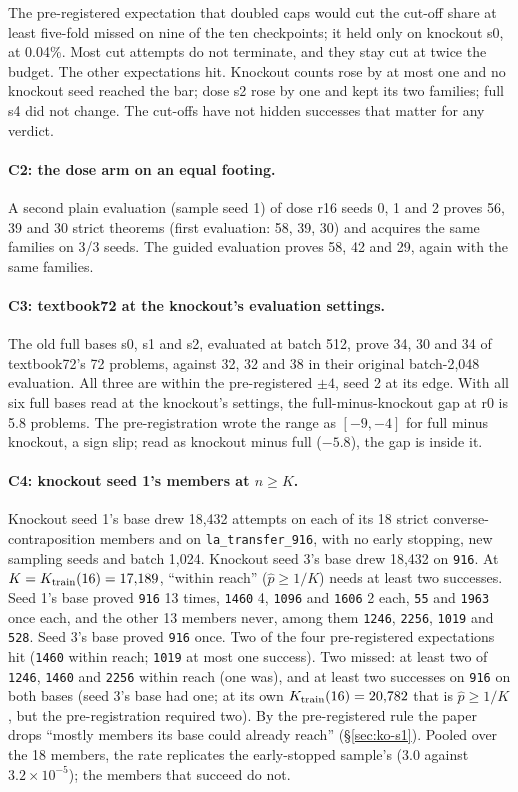 The pre-registered expectation that doubled caps would cut the cut-off share at least five-fold missed on nine of the
ten checkpoints; it held only on knockout s0, at 0.04\%. Most cut attempts do not terminate, and they stay cut at twice
the budget. The other expectations hit. Knockout counts rose by at most one and no knockout seed reached the bar; dose
s2 rose by one and kept its two families; full s4 did not change. The cut-offs have not hidden successes that matter
for any verdict.

\paragraph{C2: the dose arm on an equal footing.} A second plain evaluation (sample seed 1) of dose r16 seeds 0, 1 and 2
proves 56, 39 and 30 strict theorems (first evaluation: 58, 39, 30) and acquires the same families on 3/3 seeds. The
guided evaluation proves 58, 42 and 29, again with the same families.

\paragraph{C3: textbook72 at the knockout's evaluation settings.} The old full bases s0, s1 and s2, evaluated at batch 512,
prove 34, 30 and 34 of textbook72's 72 problems, against 32, 32 and 38 in their original batch-2,048 evaluation. All
three are within the pre-registered $\pm4$, seed 2 at its edge. With all six full bases read at the knockout's settings,
the full-minus-knockout gap at r0 is 5.8 problems. The pre-registration wrote the range as $[-9, -4]$ for full minus
knockout, a sign slip; read as knockout minus full ($-5.8$), the gap is inside it.

\paragraph{C4: knockout seed 1's members at $n \geq K$.} Knockout seed 1's base drew 18,432 attempts on each of its 18
strict converse-contraposition members and on \texttt{la\_transfer\_916}, with no early stopping, new sampling seeds and
batch 1,024.
Knockout seed 3's base drew 18,432 on \texttt{916}. At $K = K_{\mathrm{train}}(16) = 17{,}189$, ``within reach'' ($\hat p \geq 1/K$)
needs at least two successes. Seed 1's base proved \texttt{916} 13 times, \texttt{1460} 4, \texttt{1096} and
\texttt{1606} 2 each, \texttt{55} and \texttt{1963} once each, and the other 13 members never, among them
\texttt{1246}, \texttt{2256}, \texttt{1019} and \texttt{528}. Seed 3's base proved \texttt{916} once. Two of the four
pre-registered expectations hit (\texttt{1460} within reach; \texttt{1019} at most one success). Two missed: at least
two of \texttt{1246}, \texttt{1460} and \texttt{2256} within reach (one was), and at least two successes on \texttt{916}
on both bases (seed 3's base had one; at its own $K_{\mathrm{train}}(16) = 20{,}782$ that is $\hat p \geq 1/K$, but the
pre-registration required two). By the pre-registered rule the paper drops ``mostly members its base could already reach''
(\S\ref{sec:ko-s1}). Pooled over the 18 members, the rate replicates the early-stopped sample's ($3.0$ against
$3.2\times10^{-5}$); the members that succeed do not.

